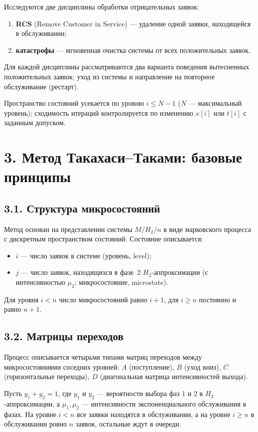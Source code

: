 Исследуются две дисциплины обработки отрицательных заявок:
\begin{enumerate}[leftmargin=1.5em]
  \item \textbf{RCS} (Remove Customer in Service) --- удаление одной заявки, находящейся в обслуживании;
  \item \textbf{катастрофы} --- мгновенная очистка системы от всех положительных заявок.
\end{enumerate}
Для каждой дисциплины рассматриваются два варианта поведения вытесненных положительных заявок: уход из системы и направление на повторное обслуживание (рестарт).

Пространство состояний усекается по уровню \(i\le N-1\) (\(N\) --- максимальный уровень); сходимость итераций контролируется по изменению \(x[i]\) или \(t[i]\) с заданным допуском.




\section*{3. Метод Такахаси--Таками: базовые принципы}
\subsection*{3.1. Структура микросостояний}
Метод основан на представлении системы \(M/H_2/n\) в виде марковского процесса с дискретным пространством состояний. Состояние описывается:
\begin{itemize}[leftmargin=1.2em]
  \item \(i\) --- число заявок в системе (уровень, level);
  \item \(j\) --- число заявок, находящихся в фазе~2 \(H_2\)-аппроксимации (с интенсивностью \(\mu_2\); микросостояние, microstate).
\end{itemize}
Для уровня \(i<n\) число микросостояний равно \(i+1\), для \(i\ge n\) постоянно и равно \(n+1\).

\subsection*{3.2. Матрицы переходов}
Процесс описывается четырьмя типами матриц переходов между микросостояниями соседних уровней: \(A\) (поступление), \(B\) (уход вниз), \(C\) (горизонтальные переходы), \(D\) (диагональная матрица интенсивностей выхода).

Пусть \(y_1+y_2=1\), где \(y_1\) и \(y_2\) --- вероятности выбора фаз 1 и 2 в \(H_2\)-аппроксимации, а \(\mu_1,\mu_2\) --- интенсивности экспоненциального обслуживания в фазах. На уровне \(i<n\) все заявки находятся в обслуживании, а на уровне \(i\ge n\) в обслуживании ровно \(n\) заявок, остальные ждут в очереди.

